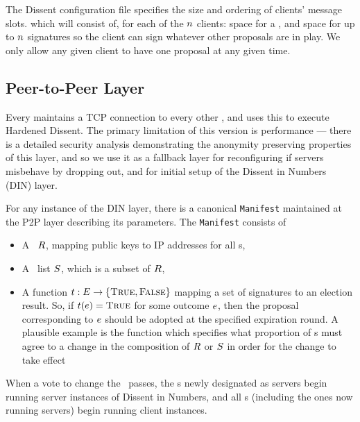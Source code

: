 The Dissent configuration file specifies the size and ordering of clients'
message slots. which will
consist of, for each of the $n$ clients: space for a \StructBallot, and space
for up to $n$ signatures so the client can sign whatever other proposals are in
play.  We only allow any given client to have one proposal at any given time.

\subsection{Peer-to-Peer Layer}
Every \KwMember maintains a TCP connection to every other \KwMember,
and uses this to execute Hardened Dissent. The primary limitation of this
version is performance --- there is a detailed security analysis demonstrating
the anonymity preserving properties of this layer, and so we use it as a
fallback layer for reconfiguring if servers misbehave by dropping out, and for
initial setup of the Dissent in Numbers (DIN) layer.

For any instance of the DIN layer, there is a canonical \texttt{Manifest}
maintained at the P2P layer describing its parameters. The \texttt{Manifest}
consists of
\begin{itemize}
  \item A \KwRoster~$R$, mapping public keys to IP addresses for all
    \KwClient s,
  \item A \KwServer~list $S$, which is a subset of $R$,
  \item A function $t : E \to \{\textsc{True}, \textsc{False}\}$
    mapping a set of signatures to an election result. So, if
    $t(e) = \textsc{True}$ for some outcome $e$,
    then the proposal corresponding to $e$ should be adopted at the
    specified expiration round. A plausible example is the function which
    specifies what proportion of \KwMember s must agree to a change in the
    composition of $R$ or $S$ in order for the change to take
    effect
\end{itemize}

When a vote to change the \KwManifest~passes, the \KwMember s newly
designated as servers begin running server instances of Dissent in Numbers, and
all \KwMember s (including the ones now running servers) begin running
client instances.


